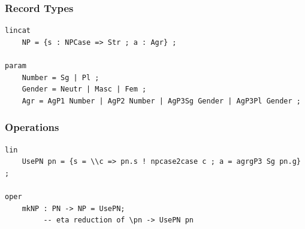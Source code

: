 \documentclass{beamer}
\begin{document}
\begin{frame}[fragile]
    \frametitle{Record Types}
\begin{lstlisting}[language=GF, breaklines=true]
lincat
    NP = {s : NPCase => Str ; a : Agr} ;

param
    Number = Sg | Pl ;
    Gender = Neutr | Masc | Fem ;
    Agr = AgP1 Number | AgP2 Number | AgP3Sg Gender | AgP3Pl Gender ;
\end{lstlisting}
\end{frame}

\begin{frame}[fragile]
    \frametitle{Operations}
\begin{lstlisting}[language=GF, breaklines=true]
lin
    UsePN pn = {s = \\c => pn.s ! npcase2case c ; a = agrgP3 Sg pn.g} ; 

oper
    mkNP : PN -> NP = UsePN;
         -- eta reduction of \pn -> UsePN pn
\end{lstlisting}
\end{frame}
\end{document}
